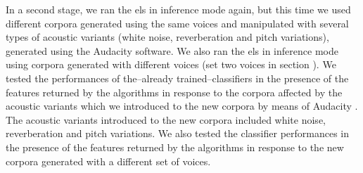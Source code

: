 {In a second stage, we ran the \glspl{el} in inference mode again, but this time we used different corpora generated using the same voices and manipulated with several types of acoustic variants (white noise, reverberation and pitch variations), generated using the Audacity software. We also ran the \glspl{el} in inference mode using corpora generated with different voices (set two voices in section ). We tested the performances of the--already trained--classifiers in the presence of the features returned by the algorithms in response to the corpora affected by the acoustic variants which we introduced to the new corpora by means of Audacity \cite{audacity}. The acoustic variants introduced to the new corpora included white noise, reverberation and pitch variations. We also tested the classifier performances in the presence of the features returned by the algorithms in response to the new corpora generated with a different set of voices.
}


























